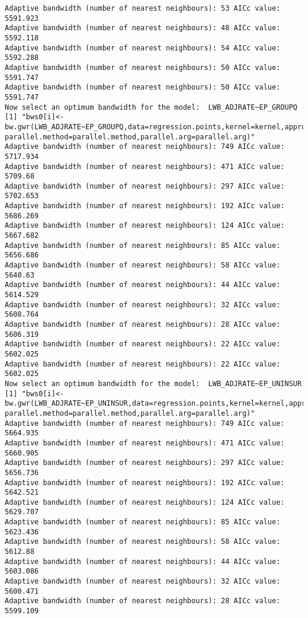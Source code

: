 \documentclass[
  12pt,
]{article}
\begin{document}
\begin{verbatim}
Adaptive bandwidth (number of nearest neighbours): 53 AICc value: 5591.923 
Adaptive bandwidth (number of nearest neighbours): 48 AICc value: 5592.118 
Adaptive bandwidth (number of nearest neighbours): 54 AICc value: 5592.288 
Adaptive bandwidth (number of nearest neighbours): 50 AICc value: 5591.747 
Adaptive bandwidth (number of nearest neighbours): 50 AICc value: 5591.747 
Now select an optimum bandwidth for the model:  LWB_ADJRATE~EP_GROUPQ 
[1] "bws0[i]<-bw.gwr(LWB_ADJRATE~EP_GROUPQ,data=regression.points,kernel=kernel,approach=approach,adaptive=adaptive,dMat=dMats[[var.dMat.indx[i]]], parallel.method=parallel.method,parallel.arg=parallel.arg)"
Adaptive bandwidth (number of nearest neighbours): 749 AICc value: 5717.934 
Adaptive bandwidth (number of nearest neighbours): 471 AICc value: 5709.68 
Adaptive bandwidth (number of nearest neighbours): 297 AICc value: 5702.653 
Adaptive bandwidth (number of nearest neighbours): 192 AICc value: 5686.269 
Adaptive bandwidth (number of nearest neighbours): 124 AICc value: 5667.682 
Adaptive bandwidth (number of nearest neighbours): 85 AICc value: 5656.686 
Adaptive bandwidth (number of nearest neighbours): 58 AICc value: 5640.63 
Adaptive bandwidth (number of nearest neighbours): 44 AICc value: 5614.529 
Adaptive bandwidth (number of nearest neighbours): 32 AICc value: 5608.764 
Adaptive bandwidth (number of nearest neighbours): 28 AICc value: 5606.319 
Adaptive bandwidth (number of nearest neighbours): 22 AICc value: 5602.025 
Adaptive bandwidth (number of nearest neighbours): 22 AICc value: 5602.025 
Now select an optimum bandwidth for the model:  LWB_ADJRATE~EP_UNINSUR 
[1] "bws0[i]<-bw.gwr(LWB_ADJRATE~EP_UNINSUR,data=regression.points,kernel=kernel,approach=approach,adaptive=adaptive,dMat=dMats[[var.dMat.indx[i]]], parallel.method=parallel.method,parallel.arg=parallel.arg)"
Adaptive bandwidth (number of nearest neighbours): 749 AICc value: 5664.935 
Adaptive bandwidth (number of nearest neighbours): 471 AICc value: 5660.905 
Adaptive bandwidth (number of nearest neighbours): 297 AICc value: 5656.736 
Adaptive bandwidth (number of nearest neighbours): 192 AICc value: 5642.521 
Adaptive bandwidth (number of nearest neighbours): 124 AICc value: 5629.707 
Adaptive bandwidth (number of nearest neighbours): 85 AICc value: 5623.436 
Adaptive bandwidth (number of nearest neighbours): 58 AICc value: 5612.88 
Adaptive bandwidth (number of nearest neighbours): 44 AICc value: 5603.086 
Adaptive bandwidth (number of nearest neighbours): 32 AICc value: 5600.471 
Adaptive bandwidth (number of nearest neighbours): 28 AICc value: 5599.109 

\end{verbatim}
\end{document}
